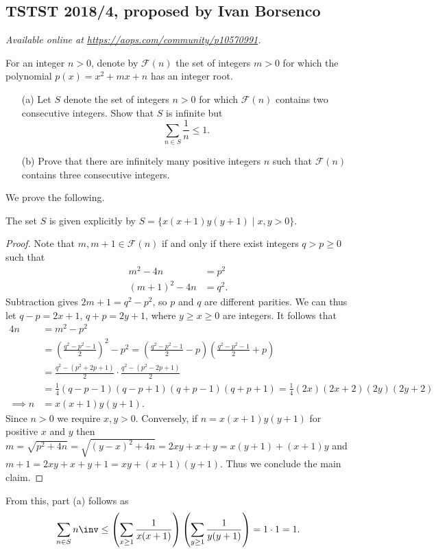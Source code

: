 \documentclass[11pt]{scrartcl}
\begin{document}
\subsection{TSTST 2018/4, proposed by Ivan Borsenco}
\textsl{Available online at \url{https://aops.com/community/p10570991}.}
\begin{mdframed}[style=mdpurplebox,frametitle={Problem statement}]
For an integer $n > 0$,
denote by $\mathcal F(n)$ the set of integers $m > 0$ for which
the polynomial $p(x) = x^2 + mx + n$ has an integer root.
\begin{enumerate}
\item [(a)] Let $S$ denote the set of integers $n > 0$
  for which $\mathcal F(n)$ contains two consecutive integers.
  Show that $S$ is infinite but
  \[ \sum_{n \in S} \frac 1n \le 1. \]
\item [(b)] Prove that there are infinitely many positive integers $n$
  such that $\mathcal F(n)$ contains three consecutive integers.
\end{enumerate}
\end{mdframed}
We prove the following.
\begin{claim*}
  The set $S$ is given explicitly by
  $S = \{ x(x+1)y(y+1) \mid x,y > 0 \}$.
\end{claim*}
\begin{proof}
  Note that $m, m+1 \in \mathcal F(n)$ if and only if
  there exist integers $q > p \ge 0$ such that
  \begin{align*}
    m^2 - 4n &= p^2 \\
    (m+1)^2 - 4n &= q^2.
  \end{align*}
  Subtraction gives $2m+1 = q^2-p^2$, so $p$ and $q$ are different parities.
  We can thus let $q-p = 2x+1$, $q+p = 2y+1$, where $y \ge x \ge 0$ are integers.
  It follows that
  \begin{align*}
    4n &= m^2 - p^2 \\
    &= \left( \frac{q^2-p^2-1}{2} \right)^2 - p^2
    = \left( \frac{q^2-p^2-1}{2} - p \right) \left( \frac{q^2-p^2-1}{2} + p \right) \\
    &= \frac{q^2-(p^2+2p+1)}{2} \cdot \frac{q^2-(p^2-2p+1)}{2} \\
    &= \frac14 (q-p-1)(q-p+1)(q+p-1)(q+p+1)
    = \frac14 (2x)(2x+2)(2y)(2y+2) \\
    \implies n &= x(x+1)y(y+1).
  \end{align*}
  Since $n > 0$ we require $x,y > 0$.
  Conversely, if $n = x(x+1)y(y+1)$ for positive $x$ and $y$ then
  $m = \sqrt{p^2+4n} = \sqrt{(y-x)^2+4n} = 2xy+x+y = x(y+1) + (x+1)y$
  and $m+1 = 2xy+x+y+1 = xy + (x+1)(y+1)$.
  Thus we conclude the main claim.
\end{proof}
From this, part (a) follows as
\[ \sum_{n \in S} n\inv
  \le
  \left( \sum_{x \ge 1} \frac{1}{x(x+1)} \right)
  \left( \sum_{y \ge 1} \frac{1}{y(y+1)} \right)
  = 1 \cdot 1 = 1.
\]
\end{document}
